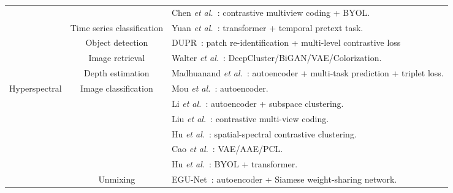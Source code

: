 \documentclass[lettersize,journal]{IEEEtran}
\newcommand{\etal}{\textit{et al.}}
\begin{document}
\begin{table*}
{\begin{tabular}{|c|c|l|}
                                 &                                               & Chen \etal~\cite{chen2021self1}: contrastive multiview coding + BYOL.                           \\ \cline{2-3} 
                                 & Time series classification                    & Yuan \etal~\cite{yuan2020self}: transformer + temporal pretext task.                            \\ \cline{2-3} 
                                 & Object detection                              & DUPR~\cite{ding2021unsupervised}: patch re-identification + multi-level contrastive loss        \\ \cline{2-3} 
                                 & Image retrieval                               & Walter \etal~\cite{walter2020self}: DeepCluster/BiGAN/VAE/Colorization.                         \\ \cline{2-3} 
                                 & Depth estimation                              & Madhuanand \etal~\cite{madhuanand2021self}: autoencoder + multi-task prediction + triplet loss. \\ \hline
\multirow{11}{*}{Hyperspectral}  & \multirow{6}{*}{Image classification}         & Mou \etal~\cite{mou2017unsupervised}: autoencoder.                                              \\
                                 &                                               & Li \etal~\cite{li2021self}: autoencoder + subspace clustering.                                  \\
                                 &                                               & Liu \etal~\cite{liu2020deep}: contrastive multi-view coding.                                    \\
                                 &                                               & Hu \etal~\cite{hu2021deep}: spatial-spectral contrastive clustering.                            \\
                                 &                                               & Cao \etal~\cite{cao2021contrastnet}: VAE/AAE/PCL.                                               \\
                                 &                                               & Hu \etal~\cite{hu2021contrastive}: BYOL + transformer.                                          \\ \cline{2-3} 
                                 & Unmixing                                      & EGU-Net~\cite{hong2021endmember}: autoencoder + Siamese weight-sharing network.                 \\ \cline{2-3} 

\end{tabular}}
\end{table*}
\end{document}
